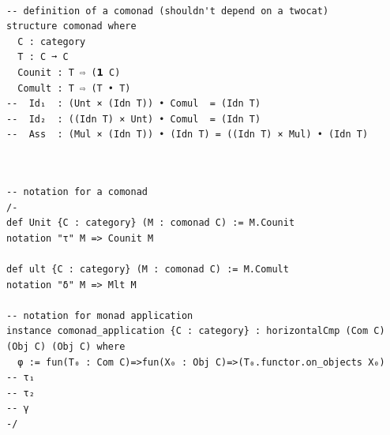 \documentclass{book}
\newcounter{lcounter}
\newcounter{sectioncount}
\newcounter{subsectioncount}
\renewcommand{\section}[1]{\newpage
\ \\
\ \\
 \begin{center} \scalebox{1.5}{\texttt{\thesectioncount . #1}} \setcounter{sectioncount}{\thesectioncount+1} \setcounter{subsectioncount}{1} \end{center}
 \begin{center}

\ \\
\ \\

\thispagestyle{empty}
\end{center}
}
\begin{document}
\begin{center}
\begin{tcolorbox}[width=5in,colback={white},title={\begin{center}\texttt{Lean \thelcounter} \addtocounter{lcounter}{1}  \end{center}},colbacktitle=Blue,coltitle=black]
\begin{verbatim}

-- definition of a comonad (shouldn't depend on a twocat)
structure comonad where
  C : category
  T : C ➞ C
  Counit : T ⇨ (𝟭 C)
  Comult : T ⇨ (T • T) 
--  Id₁  : (Unt × (Idn T)) • Comul  = (Idn T)
--  Id₂  : ((Idn T) × Unt) • Comul  = (Idn T)
--  Ass  : (Mul × (Idn T)) • (Idn T) = ((Idn T) × Mul) • (Idn T)


\end{verbatim}%
\end{tcolorbox}
\end{center}


\begin{center}
\begin{tcolorbox}[width=5in,colback={white},title={\begin{center}\texttt{Lean \thelcounter} \addtocounter{lcounter}{1}  \end{center}},colbacktitle=Green,coltitle=black]
\begin{verbatim}

-- notation for a comonad
/-
def Unit {C : category} (M : comonad C) := M.Counit
notation "τ" M => Counit M

def ult {C : category} (M : comonad C) := M.Comult
notation "δ" M => Mlt M

-- notation for monad application
instance comonad_application {C : category} : horizontalCmp (Com C) (Obj C) (Obj C) where
  φ := fun(T₀ : Com C)=>fun(X₀ : Obj C)=>(T₀.functor.on_objects X₀)
-- τ₁
-- τ₂
-- γ
-/

\end{verbatim}%
\end{tcolorbox}
\end{center}


\section{\texttt{monadicity}}
\end{document}
